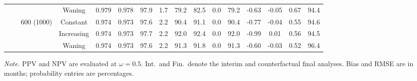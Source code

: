 \begin{table}[!htbp]
{\begin{tabular}[t]{cccccccccccccccc}
 &  &  & Waning & 0.979 & 0.978 & 97.9 & 1.7 & 79.2 & 82.5 & 0.0 & 79.2 & -0.63 & -0.05 & 0.67 & 94.4\\
\cmidrule(l{3pt}r{3pt}){3-3} \cmidrule(l{3pt}r{3pt}){4-4} \cmidrule(l{3pt}r{3pt}){5-6} \cmidrule(l{3pt}r{3pt}){7-10} \cmidrule(l{3pt}r{3pt}){11-12} \cmidrule(l{3pt}r{3pt}){13-16}
 &  & 600 (1000) & Constant & 0.974 & 0.973 & 97.6 & 2.2 & 90.4 & 91.1 & 0.0 & 90.4 & -0.77 & -0.04 & 0.55 & 94.6\\
 &  &  & Increasing & 0.974 & 0.973 & 97.7 & 2.2 & 92.0 & 92.4 & 0.0 & 92.0 & -0.99 & 0.01 & 0.56 & 94.5\\
 &  &  & Waning & 0.974 & 0.973 & 97.6 & 2.2 & 91.3 & 91.8 & 0.0 & 91.3 & -0.60 & -0.03 & 0.52 & 96.4\\
\bottomrule
\end{tabular}}
\par\vspace{2pt}
\begin{minipage}{\linewidth}
\footnotesize\raggedright
\textit{Note.} PPV and NPV are evaluated at $\omega=0.5$. Int.\ and Fin.\ denote the interim and counterfactual final analyses. Bias and RMSE are in months; probability entries are percentages.
\end{minipage}
\end{table}
